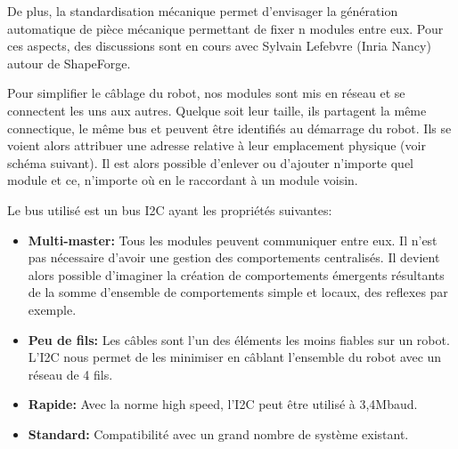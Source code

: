 \documentclass[a0,final, portrait]{inriaposter}
\begin{document}
\begin{multicols}{2}
{De plus, la standardisation mécanique permet d'envisager la génération automatique de pièce mécanique permettant de fixer n modules entre eux. Pour ces aspects, des discussions sont en cours avec Sylvain Lefebvre (Inria Nancy) autour de ShapeForge.
}


 {

Pour simplifier le câblage du robot, nos modules sont mis en réseau et se connectent les uns aux autres. Quelque soit leur taille, ils partagent la même connectique, le même bus et peuvent être identifiés au démarrage du robot. Ils se voient alors attribuer une adresse relative à leur emplacement physique (voir schéma suivant). Il est alors possible d'enlever ou d'ajouter n'importe quel module et ce, n'importe où en le raccordant à un module voisin.

Le bus utilisé est un bus I2C ayant les propriétés suivantes:

\begin{itemize}
    \item \textbf{Multi-master:} Tous les modules peuvent communiquer entre eux. Il n'est pas nécessaire d'avoir une gestion des comportements centralisés. Il devient alors possible d'imaginer la création de comportements émergents résultants de la somme d'ensemble de comportements simple et locaux, des reflexes par exemple.
    \item \textbf{Peu de fils:} Les câbles sont l'un des éléments les moins fiables sur un robot. L'I2C nous permet de les minimiser en câblant l'ensemble du robot avec un réseau de 4 fils.
    \item \textbf{Rapide:} Avec la norme high speed, l'I2C peut être utilisé à 3,4Mbaud.
    \item \textbf{Standard:} Compatibilité avec un grand nombre de système existant.
\end{itemize}


}


\end{multicols}
\end{document}
